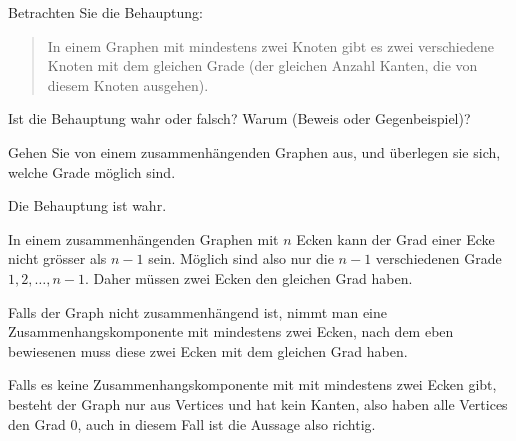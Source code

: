 Betrachten Sie die Behauptung:
\begin{quote}
In einem Graphen mit mindestens zwei Knoten gibt es zwei verschiedene Knoten
mit dem gleichen Grade (der gleichen Anzahl Kanten, die von diesem
Knoten ausgehen).
\end{quote}
Ist die Behauptung wahr oder falsch? Warum (Beweis
oder Gegenbeispiel)?

\begin{hinweis}
Gehen Sie von einem zusammenhängenden Graphen
aus, und überlegen sie sich, welche Grade möglich sind.
\end{hinweis}


\begin{loesung}
Die Behauptung ist wahr.

In einem zusammenhängenden Graphen mit $n$
Ecken kann der Grad einer Ecke nicht grösser als $n-1$ sein.
Möglich sind also nur die $n-1$ verschiedenen Grade
$1,2,\dots,n-1$. Daher müssen zwei Ecken den gleichen Grad
haben.

Falls der Graph nicht zusammenhängend ist, nimmt man eine
Zusammenhangskomponente mit mindestens zwei Ecken, nach dem
eben bewiesenen muss diese zwei Ecken mit dem gleichen
Grad haben.

Falls es keine Zusammenhangskomponente mit mit mindestens
zwei Ecken gibt, besteht der Graph nur aus Vertices und hat
kein Kanten, also haben alle Vertices den Grad $0$, auch
in diesem Fall ist die Aussage also richtig.
\end{loesung}
